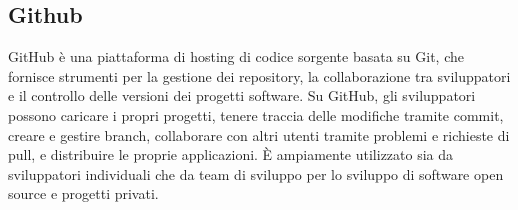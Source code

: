 \subsection*{Github} 
GitHub è una piattaforma di hosting di codice sorgente basata su Git, che fornisce strumenti per la gestione dei repository, la collaborazione tra sviluppatori e il controllo delle versioni dei progetti software. Su GitHub, gli sviluppatori possono caricare i propri progetti, tenere traccia delle modifiche tramite commit, creare e gestire branch, collaborare con altri utenti tramite problemi e richieste di pull, e distribuire le proprie applicazioni. È ampiamente utilizzato sia da sviluppatori individuali che da team di sviluppo per lo sviluppo di software open source e progetti privati.
